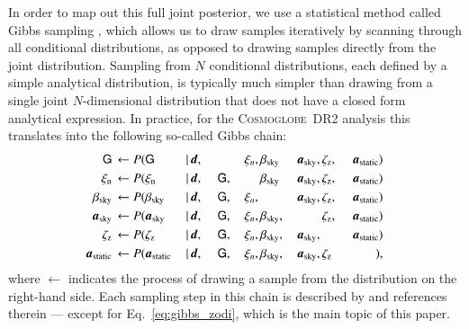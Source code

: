 \documentclass[twocolumn]{aa}
\newcommand{\dv}[0]{\vec{d}}
\renewcommand{\a}[0]{\vec{a}}
\newcommand{\cosmoglobe}{\textsc{Cosmoglobe}}
\begin{document}
In order to map out this full joint posterior, we use a statistical
method called Gibbs sampling \citep[e.g.,][]{geman:1984}, which allows
us to draw samples iteratively by scanning through all conditional
distributions, as opposed to drawing samples directly from the joint
distribution. Sampling from $N$ conditional distributions, each
defined by a simple analytical distribution, is typically much simpler
than drawing from a single joint $N$-dimensional distribution that
does not have a closed form analytical expression. In practice, for
the \cosmoglobe\ DR2 analysis this translates into the following
so-called Gibbs chain:
\begin{alignat}{11}
    \tens{G} &\,\leftarrow P(\tens{G}&\,\mid &\,\dv,&\, &\,\phantom{\tens{G}} &\,\xi_n, &
    \,\beta_{\mathrm{sky}}& \,\a_{\mathrm{sky}}, &\,\zeta_{\mathrm{z}},
    &\,\a_{\mathrm{static}})\label{eq:gibbs_G}\\
    \xi_{\mathrm{n}} &\,\leftarrow P(\xi_{\mathrm{n}}&\,\mid &\,\dv,&\, &\,\tens{G}, &\,\phantom{\xi_n} &
    \,\beta_{\mathrm{sky}}& \,\a_{\mathrm{sky}}, &\,\zeta_{\mathrm{z}},
    &\,\a_{\mathrm{static}})\\
    \beta_{\mathrm{sky}} &\,\leftarrow P(\beta_{\mathrm{sky}}&\,\mid &\,\dv,&\, &\,\tens{G}, &\,\xi_n, &
    \,\phantom{\beta_{\mathrm{sky}}}& \,\a_{\mathrm{sky}}, &\,\zeta_{\mathrm{z}}, &\,\a_{\mathrm{static}})\\
    \a_{\mathrm{sky}} &\,\leftarrow P(\a_{\mathrm{sky}}&\,\mid &\,\dv,&\, &\,\tens{G}, &\,\xi_n, &
    \,\beta_{\mathrm{sky}},& \,\phantom{\a_{\mathrm{sky}},}
    &\,\zeta_{\mathrm{z}}, &\,\a_{\mathrm{static}})\\
    \zeta_{\mathrm{z}} &\,\leftarrow P(\zeta_{\mathrm{z}}&\,\mid &\,\dv,&\, &\,\tens{G}, &\,\xi_n, &
    \,\beta_{\mathrm{sky}},& \,\a_{\mathrm{sky}},
    &\,\phantom{\zeta_{\mathrm{z}},} &\,\a_{\mathrm{static}})\label{eq:gibbs_zodi}\\
    \a_{\mathrm{static}} &\,\leftarrow P(\a_{\mathrm{static}}&\,\mid &\,\dv,&\, &\,\tens{G}, &\,\xi_n, &
    \,\beta_{\mathrm{sky}},& \,\a_{\mathrm{sky}}, &\,\zeta_{\mathrm{z}} &\,\phantom{\a_{\mathrm{static}}})\label{eq:gibbs_static},
\end{alignat}
where $\leftarrow$ indicates the process of drawing a sample from the
distribution on the right-hand side. Each sampling step in this chain
is described by \citet{CG02_01} and references therein --- except for
Eq.~\eqref{eq:gibbs_zodi}, which is the main topic of this paper.
\end{document}
